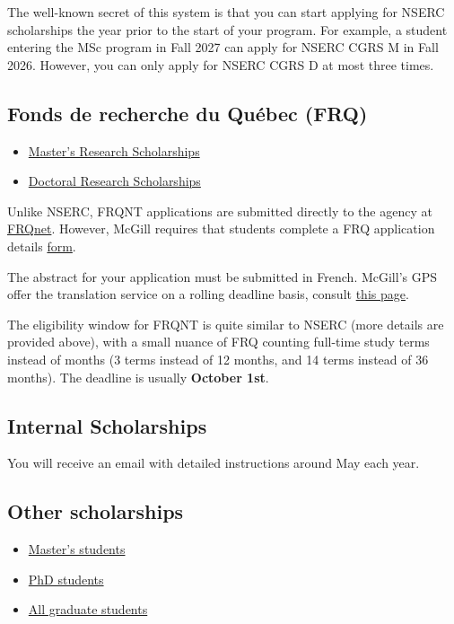 The well-known secret of this system is that you can start applying for NSERC scholarships the year prior to the start of your program. For example, a student entering the MSc program in Fall 2027 can apply for NSERC CGRS M in Fall 2026. However, you can only apply for NSERC CGRS D at most three times. 
    
\subsection{Fonds de recherche du Québec (FRQ)}
    \begin{itemize}
        \item \href{https://www.mcgill.ca/gps/funding/intl/provincial-agency-awards}{Master's Research Scholarships}
        \item \href{https://www.mcgill.ca/gps/funding/intl/provincial-agency-awards}{Doctoral Research Scholarships}  
    \end{itemize}
\begin{plainexercise}
    Unlike NSERC, FRQNT applications are submitted directly to the agency at \href{https://frqnet.frq.gouv.qc.ca/}{FRQnet}. However, McGill requires that students complete a FRQ application details \href{https://www.mcgill.ca/gps/funding/intl/provincial-agency-awards}{form}. 
    
    The abstract for your application must be submitted in French. McGill's GPS offer the translation service on a rolling deadline basis, consult \href{https://www.mcgill.ca/gps/funding/intl/provincial-agency-awards/preparing-frq-doctoral-competition}{this page}.
\end{plainexercise}
The eligibility window for FRQNT is quite similar to NSERC (more details are provided above), with a small nuance of FRQ counting full-time study terms instead of months (3 terms instead of 12 months, and 14 terms instead of 36 months). The deadline is usually \textbf{October 1st}.

\subsection{Internal Scholarships} 

You will receive an email with detailed instructions around May each year.

\subsection{Other scholarships} 
\begin{itemize}
    \item \href{https://www.mcgill.ca/gps/funding/opportunities/masters}{Master's students} 
    \item \href{https://www.mcgill.ca/gps/funding/opportunities/phd}{PhD students} 
    \item \href{https://www.mcgill.ca/studentaid/scholarships-aid/graduate}{All graduate students}
\end{itemize}

